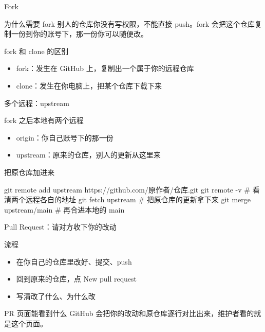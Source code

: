 \documentclass[aspectratio=169]{beamer}
\begin{document}
\begin{frame}{Fork}
	\begin{block}{为什么需要 fork}
		\hspace*{2em}别人的仓库你没有写权限，不能直接 push。fork 会把这个仓库复制一份到你的账号下，那一份你可以随便改。
	\end{block}
	\begin{block}{fork 和 clone 的区别}
		\begin{itemize}
			\item fork：发生在 GitHub 上，复制出一个属于你的远程仓库
			\item clone：发生在你电脑上，把某个仓库下载下来
		\end{itemize}
	\end{block}
\end{frame}

\begin{frame}[fragile]{多个远程：upstream}
	\begin{block}{fork 之后本地有两个远程}
		\begin{itemize}
			\item origin：你自己账号下的那一份
			\item upstream：原来的仓库，别人的更新从这里来
		\end{itemize}
	\end{block}
\begin{block}{把原仓库加进来}
\begin{semiverbatim}
git remote add upstream https://github.com/原作者/仓库.git
git remote -v              # 看清两个远程各自的地址
git fetch upstream         # 把原仓库的更新拿下来
git merge upstream/main    # 再合进本地的 main
\end{semiverbatim}
\end{block}
\end{frame}

\begin{frame}{Pull Request：请对方收下你的改动}
	\begin{block}{流程}
		\begin{itemize}
			\item 在你自己的仓库里改好、提交、push
			\item 回到原来的仓库，点 New pull request
			\item 写清改了什么、为什么改
		\end{itemize}
	\end{block}
	\begin{block}{PR 页面能看到什么}
		\hspace*{2em}GitHub 会把你的改动和原仓库逐行对比出来，维护者看的就是这个页面。
	\end{block}
\end{frame}
\end{document}
